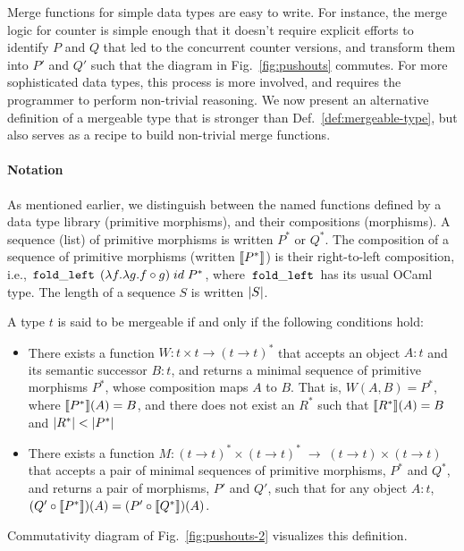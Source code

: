 
Merge functions for simple data types are easy to write. For instance,
the merge logic for counter is simple enough that it doesn't require
explicit efforts to identify $P$ and $Q$ that led to the
concurrent counter versions, and transform them into $P'$ and $Q'$
such that the diagram in Fig.~\ref{fig:pushouts} commutes. For more
sophisticated data types, this process is more involved, and requires
the programmer to perform non-trivial reasoning. We now present an
alternative definition of a mergeable type that is stronger than
Def.~\ref{def:mergeable-type}, but also serves as a recipe to build
non-trivial merge functions.

\paragraph{Notation} As mentioned earlier, we distinguish between the
named functions defined by a data type library (primitive morphisms),
and their compositions (morphisms). A sequence (list) of primitive
morphisms is written $P^*$ or $Q^*$. The composition of a sequence of
primitive morphisms (written $\llbracket P^* \rrbracket$) is their right-to-left
composition, i.e., $\,{\tt fold\_left}\,\;(\lambda f.\lambda g. f \circ
g)\; id\; P^*$, where $\,{\tt fold\_left}\,$ has its usual OCaml type. The
length of a sequence $S$ is written $\left|S\right|$.

\begin{definition} 
\label{def:mergeable-type-2}
A type $t$ is said to be mergeable if and only if the following
conditions hold:
\begin{itemize}
  \item There exists a function $W: t \times t \rightarrow (t
  \rightarrow t)^*$ that accepts an object $A:t$ and its
  semantic successor $B:t$, and returns a minimal sequence of
  primitive morphisms $P^*$, whose composition maps $A$ to $B$. That
  is, $W(A,B) = P^*$, where $\llbracket P^* \rrbracket(A) = B$, and there does not
  exist an $R^*$ such that $\llbracket R^* \rrbracket(A) = B$ and $\left|R^*\right| <
  \left|P^*\right|$

  \item There exists a function $M: (t \rightarrow t)^*\!\times\!(t
  \rightarrow t)^* \;\rightarrow\; (t \rightarrow t)\!\times\!(t
  \rightarrow t)$ that accepts a pair of minimal sequences of
  primitive morphisms, $P^*$ and $Q^*$, and returns a pair of morphisms,
  $P'$ and $Q'$, such that for any object $A:t$, $(Q' \circ
  \llbracket P^* \rrbracket)(A) = (P' \circ \llbracket Q^* \rrbracket)(A)$.  
\end{itemize}
Commutativity diagram of Fig.~\ref{fig:pushouts-2} visualizes this
definition. 
\end{definition}

